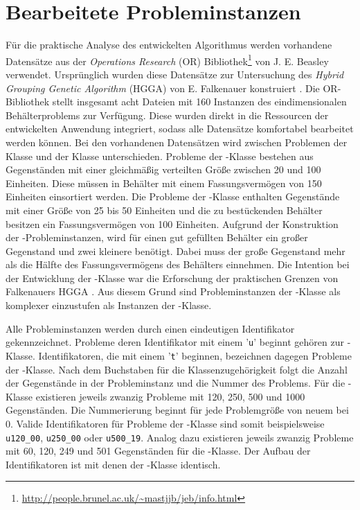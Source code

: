     \parencite{MitsuCheng:1999}

    \section{Bearbeitete Probleminstanzen}
    Für die praktische Analyse des entwickelten Algorithmus werden vorhandene Datensätze aus der \textit{Operations Research} (OR) Bibliothek\footnote{\url{http://people.brunel.ac.uk/~mastjjb/jeb/info.html}} von J. E. Beasley verwendet. Ursprünglich wurden diese Datensätze zur Untersuchung des \textit{Hybrid Grouping Genetic Algorithm} (HGGA) von E. Falkenauer konstruiert \parencite{Falkenauer:1996}. Die OR-Bibliothek stellt insgesamt acht Dateien mit 160 Instanzen des eindimensionalen Behälterproblems zur Verfügung. Diese wurden direkt in die Ressourcen der entwickelten Anwendung integriert, sodass alle Datensätze komfortabel bearbeitet werden können. Bei den vorhandenen Datensätzen wird zwischen Problemen der Klasse \uniform und der Klasse \triplets unterschieden. Probleme der \uniform-Klasse bestehen aus Gegenständen mit einer gleichmäßig verteilten Größe zwischen 20 und 100 Einheiten. Diese müssen in Behälter mit einem Fassungsvermögen von 150 Einheiten einsortiert werden. Die Probleme der \triplets-Klasse enthalten Gegenstände mit einer Größe von 25 bis 50 Einheiten und die zu bestückenden Behälter besitzen ein Fassungsvermögen von 100 Einheiten. Aufgrund der Konstruktion der \triplets-Probleminstanzen, wird für einen gut gefüllten Behälter ein großer Gegenstand und zwei kleinere benötigt. Dabei muss der große Gegenstand mehr als die Hälfte des Fassungsvermögens des Behälters einnehmen. Die Intention bei der Entwicklung der \triplets-Klasse war die Erforschung der praktischen Grenzen von Falkenauers HGGA \parencite[17]{Falkenauer:1996}. Aus diesem Grund sind Probleminstanzen der \triplets-Klasse als komplexer einzustufen als Instanzen der \uniform-Klasse.

    Alle Probleminstanzen werden durch einen eindeutigen Identifikator gekennzeichnet. Probleme deren Identifikator mit einem '\texttt{u}' beginnt gehören zur \uniform-Klasse. Identifikatoren, die mit einem '\texttt{t}' beginnen, bezeichnen dagegen Probleme der \triplets-Klasse. Nach dem Buchstaben für die Klassenzugehörigkeit folgt die Anzahl der Gegenstände in der Probleminstanz und die Nummer des Problems. Für die \uniform-Klasse existieren jeweils zwanzig Probleme mit 120, 250, 500 und 1000 Gegenständen. Die Nummerierung beginnt für jede Problemgröße von neuem bei 0. Valide Identifikatoren für Probleme der \uniform-Klasse sind somit beispielsweise \texttt{u120\_00}, \texttt{u250\_00} oder \texttt{u500\_19}. Analog dazu existieren jeweils zwanzig Probleme mit 60, 120, 249 und 501 Gegenständen für die \triplets-Klasse. Der Aufbau der Identifikatoren ist mit denen der \uniform-Klasse identisch.

